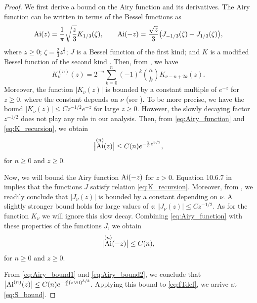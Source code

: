 \documentclass[oneside,final,11pt]{amsart}
\theoremstyle{definition}
\newcommand{\1}[1]{\mathbf{1}_{#1}}
\newcommand{\uptext}[1]{\text{\upshape{#1}}}
\DeclareMathOperator{\Ai}{\uptext{Ai}}
\numberwithin{equation}{section}
\begin{document}
\begin{proof}
We first derive a bound on the Airy function and its derivatives. The Airy function can be written in terms of the Bessel functions as
\begin{equation}\label{eq:Airy_function}
\Ai(z) = \frac{1}{\pi} \sqrt{\frac{z}{3}} K_{1/3} (\zeta), \qquad \Ai(-z) = \frac{\sqrt{z}}{3} \bigl(J_{-1/3} (\zeta) + J_{1/3} (\zeta) \bigr),
\end{equation}
where $z \geq 0$; $\zeta = \frac{2}{3} z^{\frac{3}{2}}$; $J$ is a Bessel function of the first kind; and $K$ is a modified Bessel function of the second kind \cite[Section~2.2.4]{AiryBook}. Then, from \cite[Eq.~10.29.5]{NIST:DLMF}, we have
\begin{equation}\label{eq:K_recursion}
K^{(n)}_{\nu}(z) = 2^{-n} \sum_{k = 0}^n (-1)^k \binom{n}{k} K_{\nu - n + 2 k}(z).
\end{equation}
Moreover, the function $|K_\nu(z)|$ is bounded by a constant multiple of $e^{- z}$ for $z \geq 0$, where the constant depends on $\nu$ (see \cite[Eq.~10.25.3]{NIST:DLMF}). To be more precise, we have the bound $|K_\nu(z)| \leq C z^{-1/2} e^{- z}$ for large $z \geq 0$. However, the slowly decaying factor $z^{-1/2}$ does not play any role in our analysis. Then, from \eqref{eq:Airy_function} and \eqref{eq:K_recursion}, we obtain
\begin{equation}\label{eq:Airy_bound1}
\bigl|\Ai^{(n)}(z)\bigr| \leq C(n) e^{- \frac{2}{3} z^{3/2}},
\end{equation}
for $n \geq 0$ and $z \geq 0$.

Now, we will bound the Airy function $\Ai(-z)$ for $z > 0$. Equation 10.6.7 in \cite{NIST:DLMF} implies that the functions $J$ satisfy relation \eqref{eq:K_recursion}. Moreover, from \cite[Eq.~10.7.8]{NIST:DLMF}, we readily conclude that $|J_\nu(z)|$ is bounded by a constant depending on $\nu$. A slightly stronger bound holds for large values of $z$: $|J_\nu(z)| \leq C z^{-1/2}$. As for the function $K_\nu$ we will ignore this slow decay. Combining \eqref{eq:Airy_function} with these properties of the functions $J$, we obtain
\begin{equation}\label{eq:Airy_bound2}
\bigl|\Ai^{(n)}(-z)\bigr| \leq C(n),
\end{equation}
for $n \geq 0$ and $z \geq 0$.

From \eqref{eq:Airy_bound1} and \eqref{eq:Airy_bound2}, we conclude that $\bigl|\Ai^{(n)}(z)\bigr| \leq C(n) e^{- \frac{2}{3} (z \vee 0)^{3/2}}$. Applying this bound to \eqref{eq:fTdef}, we arrive at \eqref{eq:S_bound}.
\end{proof}
\end{document}
